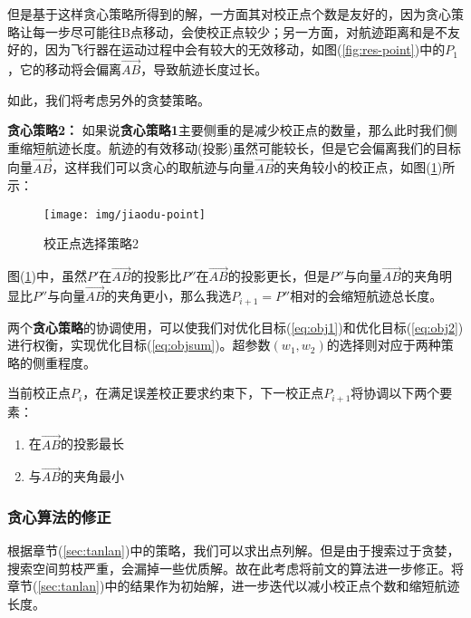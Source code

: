 但是基于这样贪心策略所得到的解，一方面其对校正点个数是友好的，因为贪心策略让每一步尽可能往B点移动，会使校正点较少；另一方面，对航迹距离和是不友好的，因为飞行器在运动过程中会有较大的无效移动，如图(\ref{fig:res-point})中的$P_1$，它的移动将会偏离$\overrightarrow{AB}$，导致航迹长度过长。

如此，我们将考虑另外的贪婪策略。

\noindent \textbf{贪心策略2：} 如果说\textbf{贪心策略1}主要侧重的是减少校正点的数量，那么此时我们侧重缩短航迹长度。航迹的有效移动(投影)虽然可能较长，但是它会偏离我们的目标向量$\overrightarrow{AB}$，这样我们可以贪心的取航迹与向量$\overrightarrow{AB}$的夹角较小的校正点，如图(\ref{fig:jiaodu-point})所示：
\begin{figure}[!h]
    \centering
    \texttt{[image: img/jiaodu-point]}
    \caption{校正点选择策略2}
    \label{fig:jiaodu-point}
\end{figure}

图(\ref{fig:jiaodu-point})中，虽然$P'$在$\overrightarrow{AB} $的投影比$P''$在$\overrightarrow{AB} $的投影更长，但是$P''$与向量$\overrightarrow{AB} $的夹角明显比$P''$与向量$\overrightarrow{AB} $的夹角更小，那么我选$P_{i+1} = P''$相对的会缩短航迹总长度。

两个\textbf{贪心策略}的协调使用，可以使我们对优化目标(\ref{eq:obj1})和优化目标(\ref{eq:obj2})进行权衡，实现优化目标(\ref{eq:objsum})。超参数$(w_1,w_2)$的选择则对应于两种策略的侧重程度。

\begin{mdframed} [%
	roundcorner=5pt,
	linecolor=gray!50,
	outerlinewidth=0.5pt,
	middlelinewidth=0.3pt, backgroundcolor=gray!2,
innertopmargin=\topskip, frametitle={贪婪思想选择策略},
frametitlefont= \bfseries,frametitlerule=true,frametitlealignment =\raggedright\noindent,
frametitlerulewidth=.5pt, frametitlebackgroundcolor=gray!2,]
当前校正点$P_i$，在满足误差校正要求约束下，下一校正点$P_{i+1}$将协调以下两个要素：
\begin{enumerate}
	\item 在$\overrightarrow{AB} $的投影最长
	\item 与$\overrightarrow{AB} $的夹角最小
\end{enumerate}
\end{mdframed}

\subsubsection{贪心算法的修正}
根据章节(\ref{sec:tanlan})中的策略，我们可以求出点列解。但是由于搜索过于贪婪，搜索空间剪枝严重，会漏掉一些优质解。故在此考虑将前文的算法进一步修正。将章节(\ref{sec:tanlan})中的结果作为初始解，进一步迭代以减小校正点个数和缩短航迹长度。

